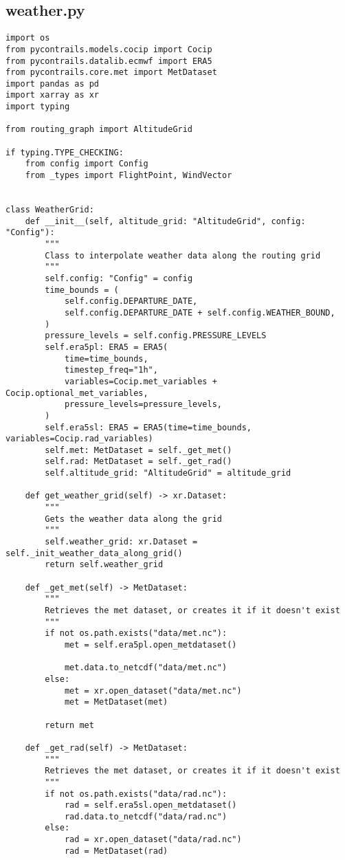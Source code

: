\subsection{weather.py}
\begin{verbatim}
import os
from pycontrails.models.cocip import Cocip
from pycontrails.datalib.ecmwf import ERA5
from pycontrails.core.met import MetDataset
import pandas as pd
import xarray as xr
import typing

from routing_graph import AltitudeGrid

if typing.TYPE_CHECKING:
    from config import Config
    from _types import FlightPoint, WindVector


class WeatherGrid:
    def __init__(self, altitude_grid: "AltitudeGrid", config: "Config"):
        """
        Class to interpolate weather data along the routing grid
        """
        self.config: "Config" = config
        time_bounds = (
            self.config.DEPARTURE_DATE,
            self.config.DEPARTURE_DATE + self.config.WEATHER_BOUND,
        )
        pressure_levels = self.config.PRESSURE_LEVELS
        self.era5pl: ERA5 = ERA5(
            time=time_bounds,
            timestep_freq="1h",
            variables=Cocip.met_variables + Cocip.optional_met_variables,
            pressure_levels=pressure_levels,
        )
        self.era5sl: ERA5 = ERA5(time=time_bounds, variables=Cocip.rad_variables)
        self.met: MetDataset = self._get_met()
        self.rad: MetDataset = self._get_rad()
        self.altitude_grid: "AltitudeGrid" = altitude_grid

    def get_weather_grid(self) -> xr.Dataset:
        """
        Gets the weather data along the grid
        """
        self.weather_grid: xr.Dataset = self._init_weather_data_along_grid()
        return self.weather_grid

    def _get_met(self) -> MetDataset:
        """
        Retrieves the met dataset, or creates it if it doesn't exist
        """
        if not os.path.exists("data/met.nc"):
            met = self.era5pl.open_metdataset()

            met.data.to_netcdf("data/met.nc")
        else:
            met = xr.open_dataset("data/met.nc")
            met = MetDataset(met)

        return met

    def _get_rad(self) -> MetDataset:
        """
        Retrieves the met dataset, or creates it if it doesn't exist
        """
        if not os.path.exists("data/rad.nc"):
            rad = self.era5sl.open_metdataset()
            rad.data.to_netcdf("data/rad.nc")
        else:
            rad = xr.open_dataset("data/rad.nc")
            rad = MetDataset(rad)


\end{verbatim}
